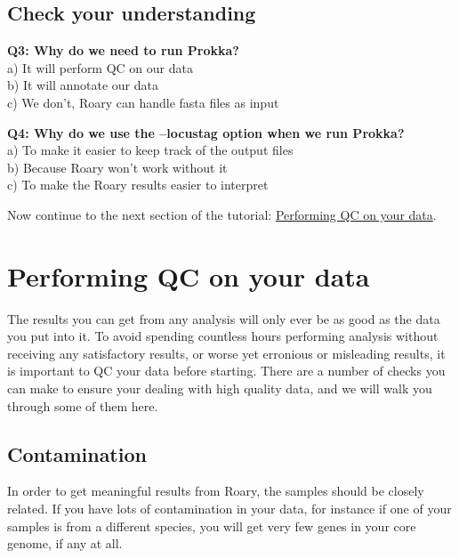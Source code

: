 \documentclass[11pt]{article}
\begin{document}
\hypertarget{check-your-understanding}{%
\subsection{Check your understanding}\label{check-your-understanding}}

\textbf{Q3: Why do we need to run Prokka?}\\
a) It will perform QC on our data\\
b) It will annotate our data\\
c) We don't, Roary can handle fasta files as input

\textbf{Q4: Why do we use the --locustag option when we run Prokka?}\\
a) To make it easier to keep track of the output files\\
b) Because Roary won't work without it\\
c) To make the Roary results easier to interpret

Now continue to the next section of the tutorial:
\href{qc.ipynb}{Performing QC on your data}.





\newpage





    \hypertarget{performing-qc-on-your-data}{%
\section{Performing QC on your data}\label{performing-qc-on-your-data}}

The results you can get from any analysis will only ever be as good as
the data you put into it. To avoid spending countless hours performing
analysis without receiving any satisfactory results, or worse yet
erronious or misleading results, it is important to QC your data before
starting. There are a number of checks you can make to ensure your
dealing with high quality data, and we will walk you through some of
them here.

\hypertarget{contamination}{%
\subsection{Contamination}\label{contamination}}

In order to get meaningful results from Roary, the samples should be
closely related. If you have lots of contamination in your data, for
instance if one of your samples is from a different species, you will
get very few genes in your core genome, if any at all.
\end{document}
